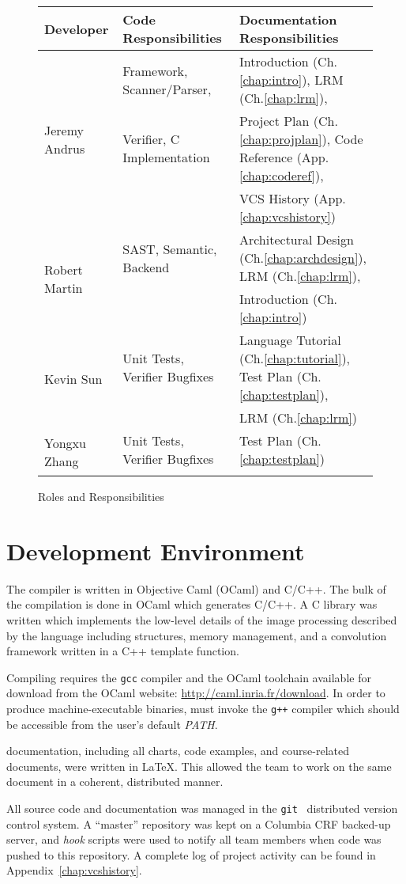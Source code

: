 \begin{figure}[h!]
  \begin{center}
    \begin{tabular}{ l | l | l }
      {\bf Developer} & {\bf Code Responsibilities} & {\bf Documentation Responsibilities} \\
      \hline
      \multirow{3}{*}{Jeremy Andrus} & Framework, Scanner/Parser, & Introduction (Ch.\ref{chap:intro}), LRM (Ch.\ref{chap:lrm}), \\
      & Verifier, C Implementation & Project Plan (Ch.\ref{chap:projplan}), Code Reference (App.\ref{chap:coderef}), \\
      & & VCS History (App.\ref{chap:vcshistory}) \\
      \hline
      \multirow{2}{*}{Robert Martin} & SAST, Semantic, Backend & Architectural Design (Ch.\ref{chap:archdesign}), LRM (Ch.\ref{chap:lrm}), \\
      & & Introduction (Ch.\ref{chap:intro})\\
      \hline
      \multirow{2}{*}{Kevin Sun} & Unit Tests, Verifier Bugfixes & Language Tutorial (Ch.\ref{chap:tutorial}), Test Plan (Ch.\ref{chap:testplan}),\\
      & & LRM (Ch.\ref{chap:lrm})\\
      \hline
      \multirow{2}{*}{Yongxu Zhang} & Unit Tests, Verifier Bugfixes & Test Plan (Ch.\ref{chap:testplan}) \\
      & & \\
    \end{tabular}
    \caption{Roles and Responsibilities}
    \label{fig:devroles}
  \end{center}
\end{figure}

\section{Development Environment}
The \sys{} compiler is written in Objective Caml (OCaml) and C/C++. The bulk of the compilation is
done in OCaml which generates C/C++. A \sys{} C library was written which implements the
low-level details of the image processing described by the language including structures,
memory management, and a convolution framework written in a C++ template function.

Compiling \sys{} requires the \texttt{gcc} compiler and the OCaml toolchain available for
download from the OCaml website: \url{http://caml.inria.fr/download}. In order to produce
machine-executable binaries, \sys{} must invoke the \texttt{g++} compiler which should be
accessible from the user's default \emph{PATH}.

\sys{} documentation, including all charts, code examples, and course-related documents,
were written in \LaTeX{}. This allowed the team to work on the same document in a coherent,
distributed manner.

All source code and documentation was managed in the \texttt{git}~\cite{git:website}
distributed version control system. A ``master'' repository was kept on a Columbia CRF backed-up
server, and \emph{hook} scripts were used to notify all team members when code was pushed to this
repository. A complete log of project activity can be found in Appendix~\ref{chap:vcshistory}.
